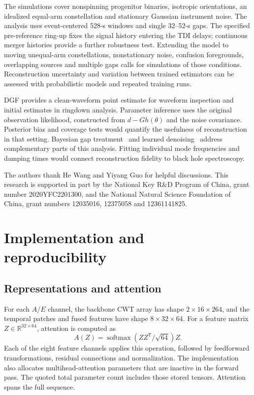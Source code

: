 \documentclass[10pt,prd,aps,a4paper,twocolumn,superscriptaddress,nofootinbib,floatfix]{revtex4-2}
\begin{document}
The simulations cover nonspinning progenitor binaries, isotropic orientations, an idealized equal-arm constellation and stationary Gaussian instrument noise. The analysis uses event-centered 528-s windows and single 32--52-s gaps. The specified pre-reference ring-up fixes the signal history entering the TDI delays; continuous merger histories provide a further robustness test. Extending the model to moving unequal-arm constellations, nonstationary noise, confusion foregrounds, overlapping sources and multiple gaps calls for simulations of those conditions. Reconstruction uncertainty and variation between trained estimators can be assessed with probabilistic models and repeated training runs.

DGF provides a clean-waveform point estimate for waveform inspection and initial estimates in ringdown analysis. Parameter inference uses the original observation likelihood, constructed from $d-Gh(\theta)$ and the noise covariance. Posterior bias and coverage tests would quantify the usefulness of reconstruction in that setting. Bayesian gap treatment~\cite{Baghi2019} and learned denoising~\cite{Wang:2024waveformer} address complementary parts of this analysis. Fitting individual mode frequencies and damping times would connect reconstruction fidelity to black hole spectroscopy.

\begin{acknowledgments}
The authors thank He Wang and Yiyang Guo for helpful discussions. This research is supported in part by the National Key R\&D Program of China, grant number 2020YFC2201300, and the National Natural Science Foundation of China, grant numbers 12035016, 12375058 and 12361141825.

\end{acknowledgments}
\clearpage
\appendix
\section{Implementation and reproducibility}\label{app:model_analysis}
\subsection{Representations and attention}
For each $A/E$ channel, the backbone CWT array has shape $2\times16\times264$, and the temporal patches and fused features have shape $8\times32\times64$. For a feature matrix $Z\in\mathbb R^{32\times64}$, attention is computed as
\begin{equation}
A(Z)=\operatorname{softmax}(ZZ^{\mathsf T}/\sqrt{64})Z.
\end{equation}
Each of the eight feature channels applies this operation, followed by feedforward transformations, residual connections and normalization. The implementation also allocates multihead-attention parameters that are inactive in the forward pass. The quoted total parameter count includes those stored tensors. Attention spans the full sequence.
\end{document}

